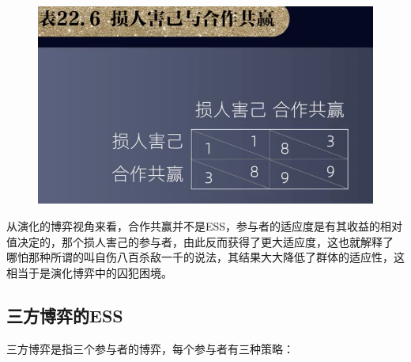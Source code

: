 \documentclass[12pt, a4paper]{article} %
\begin{document}
\begin{CJK*}{UTF8}{gbsn}
        \begin{figure}[htbp]
            \includegraphics[width=1\textwidth]{./figures/catch2023-08-05-19.07.45.png}
        \end{figure}

        从演化的博弈视角来看，合作共赢并不是ESS，参与者的适应度是有其收益的相对值决定的，那个损人害己的参与者，由此反而获得了更大适应度，这也就解释了
        哪怕那种所谓的叫自伤八百杀敌一千的说法，其结果大大降低了群体的适应性，这相当于是演化博弈中的囚犯困境。

        \subsection{三方博弈的ESS}
        三方博弈是指三个参与者的博弈，每个参与者有三种策略：

        \begin{figure}[htbp]
        \end{figure}


\end{CJK*}
\end{document}
